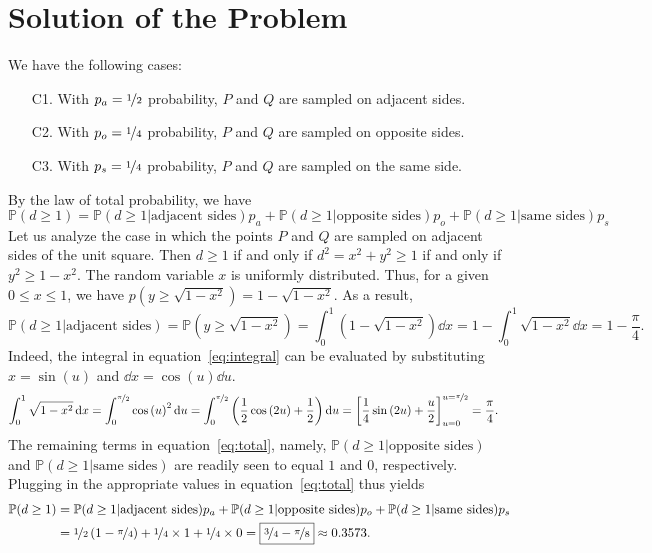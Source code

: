 \section{Solution of the Problem}
\label{sec:solution}

We have the following cases:
%
\begin{enumerate}
    \setlength\itemsep{0em}
    \item[C1.] With $p_a = \nicefrac{1}{2}$ probability, $P$ and $Q$ are sampled
        on adjacent sides.
    \item[C2.] With $p_o = \nicefrac{1}{4}$ probability, $P$ and $Q$ are sampled
        on opposite sides.
    \item[C3.] With $p_s = \nicefrac{1}{4}$ probability, $P$ and $Q$ are sampled
        on the same side.
\end{enumerate}
%
By the law of total probability, we have 
\begin{equation}
    \mathbb{P}(d \geq 1) = \mathbb{P}(d \geq 1 | \text{adjacent sides})p_a +
    \mathbb{P}(d \geq 1 | \text{opposite sides})p_o + \mathbb{P}(d \geq 1 |
    \text{same sides})p_s
    \label{eq:total}
\end{equation}
%
Let us analyze the case in which the points $P$ and $Q$ are sampled on adjacent
sides of the unit square. Then $d \geq 1$ if and only if $d^2 = x^2 + y^2 \geq
1$ if and only if $y^2 \geq 1 - x^2$. The random variable $x$ is uniformly
distributed. Thus, for a given $0 \leq x \leq 1$, we have $p(y \geq
\sqrt{1-x^2}) = 1- \sqrt{1 - x^2}$. As a result,
\begin{equation}
    \mathbb{P}(d \geq 1 | \text{adjacent sides}) = \mathbb{P}(y \geq
    \sqrt{1-x^2}) = \int_0^1 \left(1 - \sqrt{1-x^2} \right) \dd x = 1 - \int_0^1
    \sqrt{1 - x^2}\dd x = 1 - \frac{\pi}{4}.
    \label{eq:integral}
\end{equation}
%
Indeed, the integral in equation~\eqref{eq:integral} can be evaluated by
substituting $x = \sin{(u)}$ and $\dd x = \cos{(u)} \dd u$.
\begin{align*}
    \int_0^1 \sqrt{1-x^2} \operatorname{d}\! x &= \int_0^{\nicefrac{\pi}{2}} \cos{(u)}^2 \operatorname{d}\! u
    = \int_0^{\nicefrac{\pi}{2}} \left( \frac{1}{2}\cos{(2u)} + \frac{1}{2}
    \right) \operatorname{d}\! u = \left[\frac{1}{4}\sin{(2u)} +
    \frac{u}{2}\right]_{u=0}^{u=\nicefrac{\pi}{2}} = \frac{\pi}{4}.
\end{align*}
%
%
The remaining terms in equation~\eqref{eq:total}, namely, $\mathbb{P}(d \geq 1
|\text{opposite sides})$ and $\mathbb{P}(d \geq 1 | \text{same sides})$ are
readily seen to equal $1$ and $0$, respectively. Plugging in the appropriate
values in equation~\eqref{eq:total} thus yields
%
\begin{align*}
    \mathbb{P}(d \geq 1) &= \mathbb{P}(d \geq 1 | \text{adjacent sides})p_a +
    \mathbb{P}(d \geq 1 | \text{opposite sides})p_o + \mathbb{P}(d \geq 1 |
    \text{same sides})p_s \\ &= \nicefrac{1}{2}\left(1 -
    \nicefrac{\pi}{4}\right) + \nicefrac{1}{4} \times 1 + \nicefrac{1}{4} \times
    0 = \boxed{\nicefrac{3}{4} - \nicefrac{\pi}{8}}\approx 0.3573.
\end{align*}
